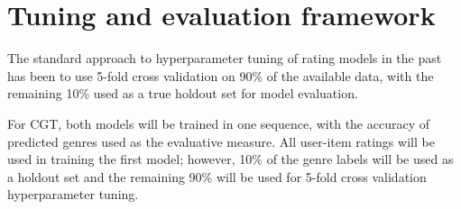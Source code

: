 \section{Tuning and evaluation framework}
The standard approach to hyperparameter tuning of rating models in the past has been to use 5-fold cross validation on 90\% of the available data, with the remaining 10\% used as a true holdout set for model evaluation.

For CGT, both models will be trained in one sequence, with the accuracy of predicted genres used as the evaluative measure. All user-item ratings will be used in training the first model; however, 10\% of the genre labels will be used as a holdout set and the remaining 90\% will be used for 5-fold cross validation hyperparameter tuning.